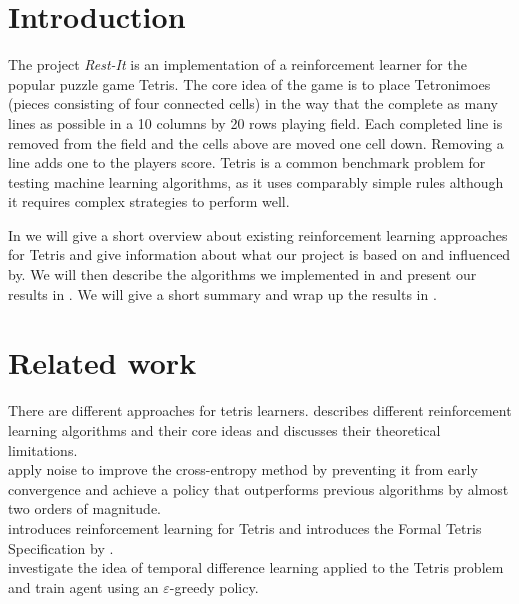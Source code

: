 \documentclass{ml}
\begin{document}


\section{Introduction}
\label{intro}
The project \textit{Rest-It} is an implementation of a reinforcement learner for the popular puzzle game Tetris. 
The core idea of the game is to place Tetronimoes (pieces consisting of four connected cells) in the way that the complete as many lines as possible in a 10 columns by 20 rows playing field.
Each completed line is removed from the field and the cells above are moved one cell down.
Removing a line adds one to the players score.
Tetris is a common benchmark problem for testing machine learning algorithms, as it uses comparably simple rules although it requires complex strategies to perform well. 

In  we will give a short overview about existing reinforcement learning approaches for Tetris and give information about what our project is based on and influenced by.
We will then describe the algorithms we implemented in  and present our results in .
We will give a short summary and wrap up the results in .


\section{Related work}
\label{relatedwork}
There are different approaches for tetris learners. 
\cite{szepesvari2010algorithms} describes different reinforcement learning algorithms and their core ideas and discusses their theoretical  limitations. \\
\cite{szita2006learning} apply noise to improve the cross-entropy method by preventing it from early convergence and achieve a policy that outperforms previous algorithms by almost two orders of magnitude.\\
\cite{carr2005applying} introduces reinforcement learning for Tetris and introduces the Formal \cite{gross2008learningto}Tetris Specification by \cite{faheytetris}.\\
\cite{gross2008learningto} investigate the idea of temporal difference learning applied to the Tetris problem and train agent using an $\varepsilon$-greedy policy. 
\end{document}
